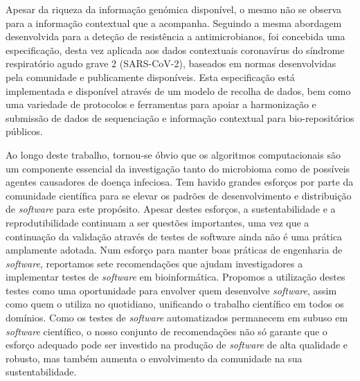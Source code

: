 Apesar da riqueza da informação genómica disponível, o mesmo não se observa para a informação contextual que a acompanha. Seguindo a mesma abordagem desenvolvida para a deteção de resistência a antimicrobianos, foi concebida uma especificação, desta vez aplicada aos dados contextuais coronavírus do síndrome respiratório agudo grave 2 (SARS-CoV-2), baseados em normas desenvolvidas pela comunidade e publicamente disponíveis. Esta especificação está implementada e disponível através de um modelo de recolha de dados, bem como uma variedade de protocolos e ferramentas para apoiar a harmonização e submissão de dados de sequenciação e informação contextual para bio-repositórios públicos.

Ao longo deste trabalho, tornou-se óbvio que os algoritmos computacionais são um componente essencial da investigação tanto do microbioma como de possíveis agentes causadores de doença infeciosa. Tem havido grandes esforços por parte da comunidade científica para se elevar os padrões de desenvolvimento e distribuição de \textit{software} para este propósito. Apesar destes esforços, a sustentabilidade e a reprodutibilidade continuam a ser questões importantes, uma vez que a continuação da validação através de testes de software ainda não é uma prática amplamente adotada. Num esforço para manter boas práticas de engenharia de \textit{software}, reportamos sete recomendações que ajudam investigadores a implementar testes de \textit{software} em bioinformática. Propomos a utilização destes testes como uma oportunidade para envolver quem desenvolve \textit{software}, assim como quem o utiliza no quotidiano, unificando o trabalho científico em todos os domínios. Como os testes de \textit{software} automatizados permanecem em subuso em \textit{software} científico, o nosso conjunto de recomendações não só garante que o esforço adequado pode ser investido na produção de \textit{software} de alta qualidade e robusto, mas também aumenta o envolvimento da comunidade na sua sustentabilidade.

